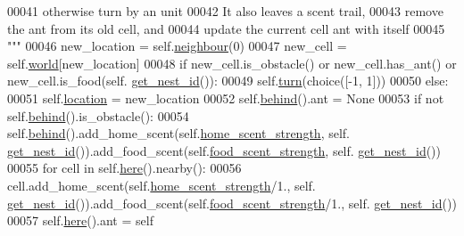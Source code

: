 \begin{DoxyCode}
00041 \textcolor{stringliteral}{        otherwise turn by an unit}
00042 \textcolor{stringliteral}{        It also leaves a scent trail,}
00043 \textcolor{stringliteral}{        remove the ant from its old cell, and}
00044 \textcolor{stringliteral}{        update the current cell ant with itself}
00045 \textcolor{stringliteral}{        """}
00046         new\_location = self.\hyperlink{classants_1_1Ant_a2ddd97dadaa5d24c459b0117dc6e1190}{neighbour}(0)       
00047         new\_cell = self.\hyperlink{classants_1_1Ant_a55f64c7cafb3806bdcfda42586adbff5}{world}[new\_location]
00048         \textcolor{keywordflow}{if} new\_cell.is\_obstacle() \textcolor{keywordflow}{or} new\_cell.has\_ant() \textcolor{keywordflow}{or} new\_cell.is\_food(self.
      \hyperlink{classants_1_1Ant_a10dc42722864d5850912dd34242d5cf8}{get\_nest\_id}()):
00049             self.\hyperlink{classants_1_1Ant_a445ec1d1f8e4cb539c4f66fafa129131}{turn}(choice([-1, 1]))
00050         \textcolor{keywordflow}{else}:
00051             self.\hyperlink{classants_1_1Ant_ae7de139b6f5bdb8d4ab42755c405ef5d}{location} = new\_location
00052             self.\hyperlink{classants_1_1Ant_a192f8411faa05c48db8db99d033f5d15}{behind}().ant = \textcolor{keywordtype}{None}
00053             \textcolor{keywordflow}{if} \textcolor{keywordflow}{not} self.\hyperlink{classants_1_1Ant_a192f8411faa05c48db8db99d033f5d15}{behind}().is\_obstacle():
00054                 self.\hyperlink{classants_1_1Ant_a192f8411faa05c48db8db99d033f5d15}{behind}().add\_home\_scent(self.\hyperlink{classants_1_1Ant_a7885f0124adf5b10fd6fa5e8ac47edb9}{home\_scent\_strength}, self.
      \hyperlink{classants_1_1Ant_a10dc42722864d5850912dd34242d5cf8}{get\_nest\_id}()).add\_food\_scent(self.\hyperlink{classants_1_1Ant_ad7fb2ac4566880fdacfd7bf7f4ec1109}{food\_scent\_strength}, self.
      \hyperlink{classants_1_1Ant_a10dc42722864d5850912dd34242d5cf8}{get\_nest\_id}())
00055             \textcolor{keywordflow}{for} cell \textcolor{keywordflow}{in} self.\hyperlink{classants_1_1Ant_a2e60480b7534b107e12d7f23fd06d5f1}{here}().nearby():
00056                 cell.add\_home\_scent(self.\hyperlink{classants_1_1Ant_a7885f0124adf5b10fd6fa5e8ac47edb9}{home\_scent\_strength}/1., self.
      \hyperlink{classants_1_1Ant_a10dc42722864d5850912dd34242d5cf8}{get\_nest\_id}()).add\_food\_scent(self.\hyperlink{classants_1_1Ant_ad7fb2ac4566880fdacfd7bf7f4ec1109}{food\_scent\_strength}/1., self.
      \hyperlink{classants_1_1Ant_a10dc42722864d5850912dd34242d5cf8}{get\_nest\_id}())
00057             self.\hyperlink{classants_1_1Ant_a2e60480b7534b107e12d7f23fd06d5f1}{here}().ant = self

\end{DoxyCode}
